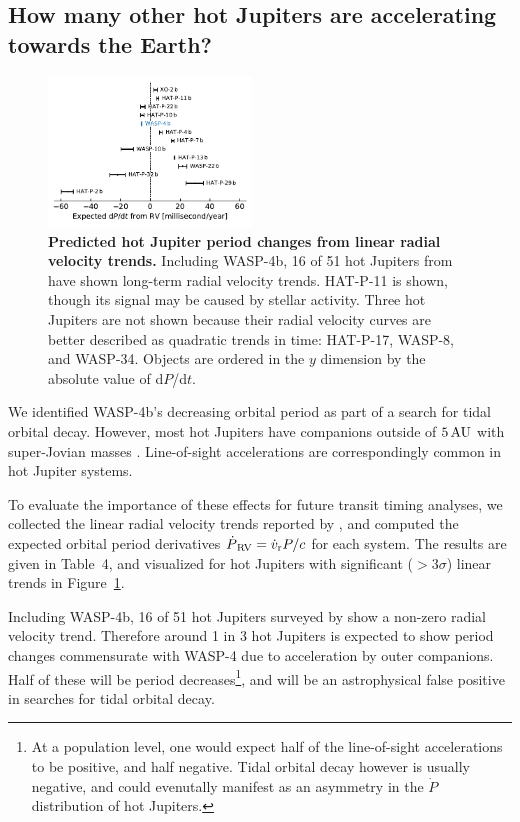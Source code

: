 \documentclass[12pt,twocolumn,tighten]{aastex62}
\begin{document}
\subsection{How many other hot Jupiters are accelerating towards the
Earth?}

\begin{figure}[t]
	\begin{center}
		\leavevmode
		\includegraphics[width=0.48\textwidth]{f5.pdf}
	\end{center}
	\vspace{-0.4cm}
	\caption{
  {\bf Predicted hot Jupiter period changes from linear radial
  velocity trends.} Including WASP-4b, 16 of 51 hot Jupiters from
  \citet{knutson_friends_2014} have shown long-term radial velocity
  trends.  HAT-P-11 is shown, though its signal may be caused
  by stellar activity.  Three hot Jupiters are not shown because
  their radial velocity curves are better described as quadratic
  trends in time: HAT-P-17, WASP-8, and WASP-34.  Objects are ordered
  in the $y$ dimension by the absolute value of d$P$/d$t$.
	\label{fig:pdot_pop}
  \vspace{-0.3cm}
	}
\end{figure}

We identified WASP-4b's decreasing orbital period as part of a search
for tidal orbital decay.  However, most hot Jupiters have companions
outside of $5\,{\rm AU}$ with super-Jovian masses
\citep{knutson_friends_2014,bryan_statistics_2016}.  Line-of-sight
accelerations are correspondingly common in hot Jupiter systems. 

To evaluate the importance of these effects for future transit timing
analyses, we collected the linear radial velocity trends reported by
\citet{knutson_friends_2014}, and computed the expected orbital period
derivatives $\dot{P}_{\rm\,RV} = \dot{v}_{\rm r} P/c$ for each system.
The results are given in Table~4, and visualized for hot Jupiters with
significant ($>$$3\sigma$) linear trends in Figure~\ref{fig:pdot_pop}.

Including WASP-4b, 16 of 51 hot Jupiters surveyed by
\citet{knutson_friends_2014} show a non-zero radial velocity trend.
Therefore around 1 in 3 hot Jupiters is expected to show period
changes commensurate with WASP-4 due to acceleration by outer
companions.  Half of these will be period decreases\footnote{ At a
population level, one would expect half of the line-of-sight
accelerations to be positive, and half negative.  Tidal orbital decay
however is usually negative, and could evenutally manifest as an asymmetry in the
$\dot{P}$ distribution of hot Jupiters.}, and will be an
astrophysical false positive in searches for tidal orbital decay.
\end{document}
